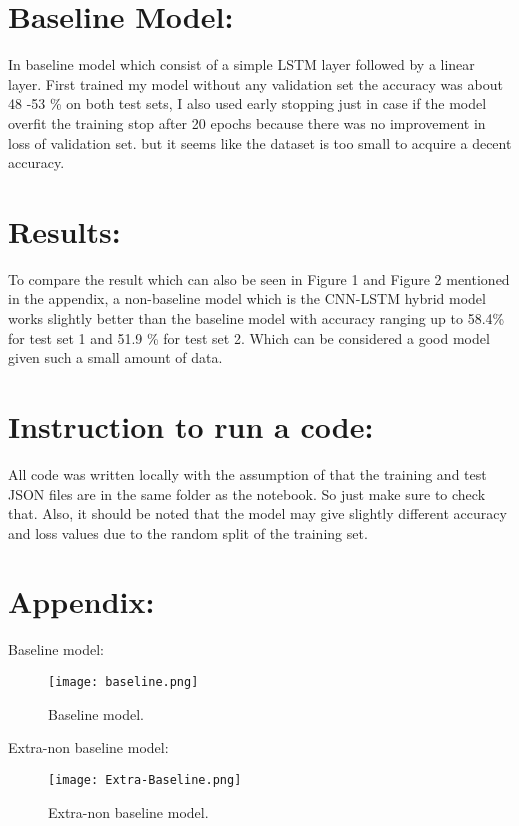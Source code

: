 \documentclass[11pt]{article}
\begin{document}
\section{Baseline Model: } 
In baseline model which consist of a simple LSTM layer followed by a linear layer. First trained my model without any validation set the accuracy was about 48 -53 \% on both test sets, I also used early stopping just in case if the model overfit the training stop after 20 epochs because there was no improvement in loss of validation set. but it seems like the dataset is too small to acquire a decent accuracy.
\section{Results: } 
To compare the result which can also be seen in Figure 1 and Figure 2 mentioned in the appendix, a non-baseline model which is the CNN-LSTM hybrid model works slightly better than the baseline model with accuracy ranging up to 58.4\% for test set 1 and 51.9 \% for test set 2. Which can be considered a good model given such a small amount of data.

\section{Instruction to run a code: }
All code was written locally with the assumption of that the training and test JSON files are in the same folder as the notebook. So just make sure to check that. Also, it should be noted that the model may give slightly different accuracy and loss values due to the random split of the training set.

\section{Appendix:}
 Baseline model:
\begin{figure}[H] %
  \centering
  \texttt{[image: baseline.png]}
  \caption{Baseline model.}
  \label{fig:baseline}
\end{figure}

Extra-non baseline model:
\begin{figure}[H]
  \centering
  \texttt{[image: Extra-Baseline.png]}
  \caption{Extra-non baseline model.}
  \label{fig:extra}
\end{figure}
\end{document}
